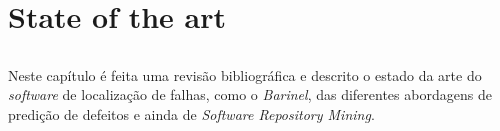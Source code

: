 \chapter{State of the art} \label{chap:sota}

\section*{}

Neste capítulo é feita uma revisão bibliográfica e descrito o estado da arte do \emph{software} de localização de falhas, como o \emph{Barinel}, das diferentes abordagens de predição de defeitos e ainda de \emph{Software Repository Mining}.






